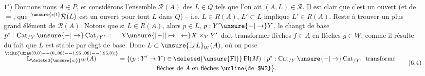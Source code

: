 $1^\circ)$ Donnons nous $A\in P$, et considérons l'ensemble
$\mathcal R(A)$ des $L\in Q$ tels que l'on ait 
$(A,L)\in\mathcal R$. Il est clair que c'est un ouvert
(et de $=$, que $\,{}^{\unsure{c|t}}\mathcal R(L)$ est un ouvert  pour
tout $L$ dans $Q$) -- i.e. $L\in R(A)$, $L'\subset L$
implique $L'\in R(A)$. Reste à trouver un
plus grand élément de $\mathcal R(A)$. Notons que
si $L\in R(A)$, alors 
$p\in L$, $p:Y'\unsure{-|\to}Y$, le changt de base
$p^{*}:\operatorname{Cat}_{/Y}\unsure{-|\to}\operatorname{Cat}_{/Y'}\ :\quad X\unsure{\vert\!-\!\vert|\mapsto|\leftarrow}X\times_Y Y'$
doit transformer flèches $f\in A$ en flèches $g\in W$,
comme il résulte du fait que
$L$ est stable par chgt de base.
Donc $L\subset\unsure{\mathbb{L}|L}_W(A)$, où on pose
\[
\begin{aligned}
\overset{\smash{\tikz{\draw (0,0)--(0,.08)--(.95,.08)--(.95,0);}}}{\mathbb L_{\deleted{\unsure{w}}W}(A)}
 &=\{(p:Y'\to Y)\in\deleted{\unsure{\operatorname{Fl}}}\operatorname{Fl}(M)
 \mid p^*:\operatorname{Cat}_{/Y}\unsure{-|\to}\operatorname{Cat}_{/Y'}\ \text{transforme}\\
 &\hspace{6em}\text{flèches de }A\text{ en flèches \uuline{de $W$}}\}.
\end{aligned}\tag*{(6.4)}
\]

